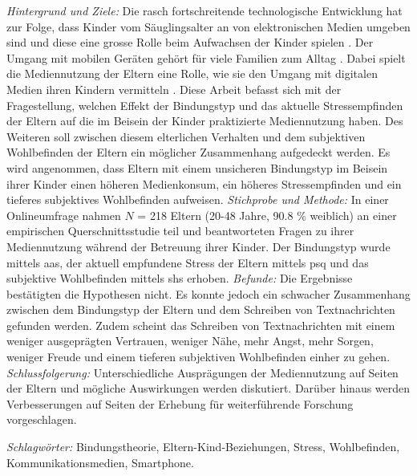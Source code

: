\begin{flushleft}
\textit{Hintergrund und Ziele:} Die rasch fortschreitende technologische Entwicklung hat zur Folge, dass Kinder vom Säuglingsalter an von elektronischen Medien umgeben sind und diese eine grosse Rolle beim Aufwachsen der Kinder spielen \cite{Feierabend2015}. Der Umgang mit mobilen Geräten gehört für viele Familien zum Alltag \cite{Wagner2016}. Dabei spielt die Mediennutzung der Eltern eine Rolle, wie sie den Umgang mit digitalen Medien ihren Kindern vermitteln \cite{Livingstone2015a}. Diese Arbeit befasst sich mit der Fragestellung, welchen Effekt der Bindungstyp und das aktuelle Stressempfinden der Eltern auf die im Beisein der Kinder praktizierte Mediennutzung haben. Des Weiteren soll zwischen diesem elterlichen Verhalten und dem subjektiven Wohlbefinden der Eltern ein möglicher Zusammenhang aufgedeckt werden. Es wird angenommen, dass Eltern mit einem unsicheren Bindungstyp im Beisein ihrer Kinder einen höheren Medienkonsum, ein höheres Stressempfinden und ein tieferes subjektives Wohlbefinden aufweisen. \textit{Stichprobe und Methode:} In einer Online\-umfrage nahmen $N$ = 218 Eltern (20-48 Jahre, 90.8 \% weiblich) an einer empirischen Querschnittsstudie teil und beantworteten Fragen zu ihrer Mediennutzung während der Betreuung ihrer Kinder. Der Bindungstyp wurde mittels \acrfull{aas}, der aktuell empfundene Stress der Eltern mittels \acrfull{psq} und das subjektive Wohlbefinden mittels \acrfull{shs} erhoben. 
\textit{Befunde:} Die Ergebnisse bestätigten die Hypothesen nicht. Es konnte jedoch ein schwacher Zusammenhang zwischen dem Bindungstyp der Eltern und dem Schreiben von Textnachrichten gefunden werden. Zudem scheint das Schreiben von Textnachrichten mit einem weniger ausgeprägten Vertrauen, weniger Nähe, mehr Angst, mehr Sorgen, weniger Freude und einem tieferen subjektiven Wohlbefinden einher zu gehen. 
\textit{Schlussfolgerung:} Unterschiedliche Ausprägungen der Mediennutzung auf Seiten der Eltern und mögliche Auswirkungen werden diskutiert. Darüber hinaus werden Verbesserungen auf Seiten der Erhebung für weiterführende Forschung vorgeschlagen. \linebreak


\textit{Schlagwörter:} Bindungstheorie, Eltern-Kind-Beziehungen, Stress, Wohlbefinden, Kommunikationsmedien, Smartphone.

\end{flushleft}
